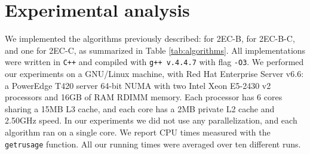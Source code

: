 \documentclass[11pt]{article}
\begin{document}
\section{Experimental analysis}
\label{sec:experimental}

We implemented the algorithms previously described:  for \textsf{2EC-B},   for \textsf{2EC-B-C}, and one for \textsf{2EC-C}, as summarized in Table \ref{tab:algorithms}.
All implementations were written in {\tt C++} and compiled with {\tt g++ v.4.4.7} with flag {\tt -O3}.
We performed our experiments on a GNU/Linux machine, with Red Hat Enterprise Server v6.6: a PowerEdge T420 server 64-bit NUMA
with two Intel Xeon E5-2430 v2 processors  and 16GB of RAM RDIMM memory. Each processor has 6 cores sharing a 15MB L3 cache, and each core has a 2MB private L2 cache and 2.50GHz speed. In our experiments we did not use any parallelization, and each algorithm ran on a single core.
We report CPU times measured with the \texttt{getrusage} function. All our running times were averaged over ten different runs.
\end{document}
